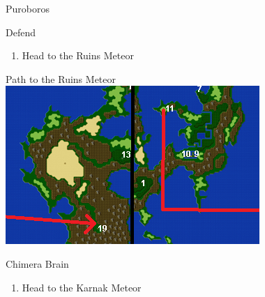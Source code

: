 \begin{paracol}{2}
\switchcolumnTwice[*]
\begin{boss}{Puroboros}
	\varwb
	\begin{round}{1}
		\lenna Defend
        \faris \leftCommand{\gilToss}
        \item {}
        \item {}
        \vspace{1mm}
        \item[] 
    \end{round}
	\varwe
\end{boss}

\begin{enumerate}[resume]
    \item Head to the Ruins Meteor
\end{enumerate}

\switchcolumn
\begin{misc}{Path to the Ruins Meteor}
    \includegraphics[scale=1.15]{../Graphics/Maps/9. To Ruins Meteor.png}
\end{misc}

\switchcolumn*
\begin{boss}{Chimera Brain}
	\varwb
	\begin{round}{1}
		\lenna \rightCommand{\tame}
        \faris \leftCommand{\gilToss}
        \bartz \leftCommand{\gilToss}
    \end{round}
	\varwe
\end{boss}

\begin{enumerate}[resume]
    \item Head to the Karnak Meteor
\end{enumerate}


\end{paracol}
